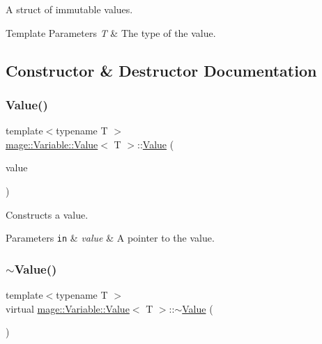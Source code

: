 A struct of immutable values. 
\begin{DoxyTemplParams}{Template Parameters}
{\em T} & The type of the value. \\
\hline
\end{DoxyTemplParams}


\subsection{Constructor \& Destructor Documentation}
\hypertarget{structmage_1_1_variable_1_1_value_a1e29cc5eaeb8356a11a1eca0232cf162}{}\label{structmage_1_1_variable_1_1_value_a1e29cc5eaeb8356a11a1eca0232cf162} 
\subsubsection{\texorpdfstring{Value()}{Value()}}
{\footnotesize\ttfamily template$<$typename T $>$ \\
\hyperlink{structmage_1_1_variable_1_1_value}{mage\+::\+Variable\+::\+Value}$<$ T $>$\+::\hyperlink{structmage_1_1_variable_1_1_value}{Value} (\begin{DoxyParamCaption}\item[{const T $\ast$}]{value }\end{DoxyParamCaption})}

Constructs a value.


\begin{DoxyParams}[1]{Parameters}
\mbox{\tt in}  & {\em value} & A pointer to the value. \\
\hline
\end{DoxyParams}
\hypertarget{structmage_1_1_variable_1_1_value_ab0b88d59c1049b89557fbaf649a3b459}{}\label{structmage_1_1_variable_1_1_value_ab0b88d59c1049b89557fbaf649a3b459} 
\subsubsection{\texorpdfstring{$\sim$\+Value()}{~Value()}}
{\footnotesize\ttfamily template$<$typename T $>$ \\
virtual \hyperlink{structmage_1_1_variable_1_1_value}{mage\+::\+Variable\+::\+Value}$<$ T $>$\+::$\sim$\hyperlink{structmage_1_1_variable_1_1_value}{Value} (\begin{DoxyParamCaption}{ }\end{DoxyParamCaption})\hspace{0.3cm}{\ttfamily [virtual]}}

